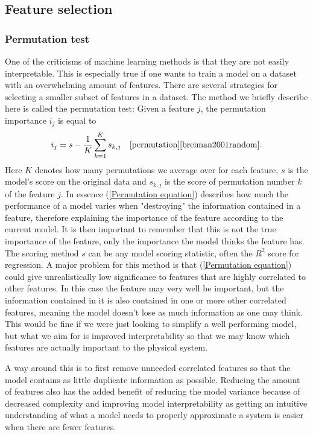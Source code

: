 \subsection{Feature selection}
\subsubsection{Permutation test}
\label{Feature selection}
One of the criticisms of machine learning methods
is that they are not easily interpretable. This 
is especially true if one wants to train a model 
on a dataset with an overwhelming amount of 
features. There are several strategies for 
selecting a smaller subset of features in a dataset.
The method we briefly describe here is called the 
permutation test:
Given a feature $j$, the permutation importance 
$i_j$ is equal to 
\begin{equation}
i_j = s - \frac{1}{K} \sum_{k=1}^K s_{k,j}\quad \cite{permutation} \cite{breiman2001random}.
\label{Permutation equation}
\end{equation}
Here $K$ denotes how many permutations we average over for each feature, $s$ is
the model's score on the original data and $s_{k,j}$ is the score of permutation 
number $k$ of the feature $j$. In essence (\ref{Permutation equation}) describes 
how much the performance of a model varies when "destroying" the information 
contained in a feature, therefore explaining the importance of the feature 
according to the current model. It is then important to remember that this is not 
the true importance of the feature, only the importance the model thinks the feature 
has. The scoring method $s$ can be any model scoring statistic, often the $R^2$
score for regression.
A major problem for this method is that (\ref{Permutation equation}) could give 
unrealistically low significance to features that are highly correlated to other 
features. In this case the feature may very well be important, but the information 
contained in it is also contained in one or more other correlated features, meaning 
the model doesn't lose as much information as one may think. This would be fine 
if we were just looking to simplify a well performing model, but what we aim for 
is improved interpretability so that we may know which features are actually important 
to the physical system.

A way around this is to first remove unneeded correlated features so that the model 
contains as little duplicate information as possible. Reducing the amount of 
features also has the added benefit of reducing the model variance because of 
decreased complexity and improving model interpretability as getting an intuitive 
understanding of what a model needs to properly approximate a system is easier when 
there are fewer features.


